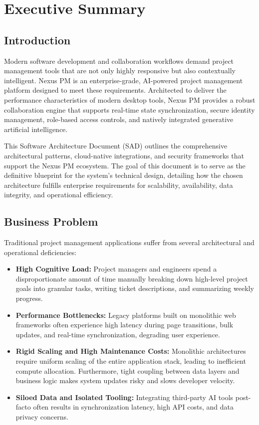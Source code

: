 \chapter{Executive Summary}
\label{chap:executive-summary}

\section{Introduction}
Modern software development and collaboration workflows demand project management tools that are not only highly responsive but also contextually intelligent. Nexus PM is an enterprise-grade, AI-powered project management platform designed to meet these requirements. Architected to deliver the performance characteristics of modern desktop tools, Nexus PM provides a robust collaboration engine that supports real-time state synchronization, secure identity management, role-based access controls, and natively integrated generative artificial intelligence.

This Software Architecture Document (SAD) outlines the comprehensive architectural patterns, cloud-native integrations, and security frameworks that support the Nexus PM ecosystem. The goal of this document is to serve as the definitive blueprint for the system's technical design, detailing how the chosen architecture fulfills enterprise requirements for scalability, availability, data integrity, and operational efficiency.

\section{Business Problem}
Traditional project management applications suffer from several architectural and operational deficiencies:
\begin{itemize}
    \item \textbf{High Cognitive Load:} Project managers and engineers spend a disproportionate amount of time manually breaking down high-level project goals into granular tasks, writing ticket descriptions, and summarizing weekly progress.
    \item \textbf{Performance Bottlenecks:} Legacy platforms built on monolithic web frameworks often experience high latency during page transitions, bulk updates, and real-time synchronization, degrading user experience.
    \item \textbf{Rigid Scaling and High Maintenance Costs:} Monolithic architectures require uniform scaling of the entire application stack, leading to inefficient compute allocation. Furthermore, tight coupling between data layers and business logic makes system updates risky and slows developer velocity.
    \item \textbf{Siloed Data and Isolated Tooling:} Integrating third-party AI tools post-facto often results in synchronization latency, high API costs, and data privacy concerns.
\end{itemize}


